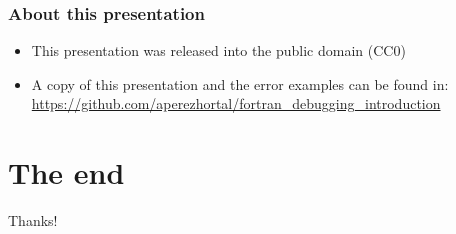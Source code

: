 \documentclass[t]{myBeamer}
\begin{document}
\begin{frame}[t]
\frametitle{ About this presentation }
\centering

\begin{itemize}
 \item This presentation was released into the public domain (CC0)
 \item{ A copy of this presentation and the error examples can be found in:\\
 \url{https://github.com/aperezhortal/fortran_debugging_introduction}
 }
 
 
\end{itemize}

\end{frame}
\section{The end}
\begin{frame}[c]
\centering
\Huge
Thanks!
\end{frame}


% 
% 
\end{document}
